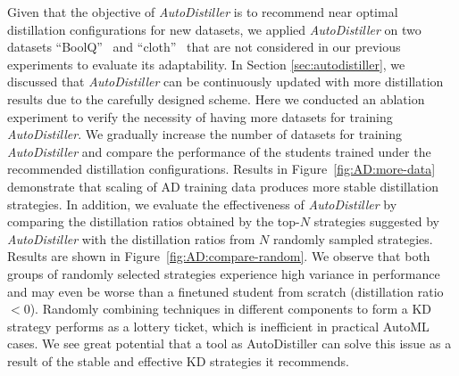 \documentclass[11pt]{article}
\begin{document}
Given that the objective of \emph{AutoDistiller} is to recommend near optimal distillation configurations for new datasets, we applied \emph{AutoDistiller} on two datasets ``BoolQ''~\citep{wang2019superglue} and ``cloth''~\citep{shi2021multimodal} that are not considered in our previous experiments to evaluate its adaptability. In Section \ref{sec:autodistiller}, we discussed that \emph{AutoDistiller} can be continuously updated with more distillation results due to the carefully designed scheme. Here we conducted an ablation experiment to verify the necessity of having more datasets for training \emph{AutoDistiller}. We gradually increase the number of datasets for training \emph{AutoDistiller} and compare the performance of the students trained under the recommended distillation configurations. Results in Figure~\ref{fig:AD:more-data} demonstrate that scaling of AD training data produces more stable distillation strategies.
In addition, we evaluate the effectiveness of \emph{AutoDistiller} by comparing the distillation ratios obtained by the top-$N$ strategies suggested by \emph{AutoDistiller} with the distillation ratios from $N$ randomly sampled strategies. Results are shown in Figure~\ref{fig:AD:compare-random}. We observe that both groups of randomly selected strategies experience high variance in performance and may even be worse than a finetuned student from scratch (distillation ratio $<0$). Randomly combining techniques in different components to form a KD strategy performs as a lottery ticket, which is inefficient in practical AutoML cases. We see great potential that a tool as AutoDistiller can solve this issue as a result of the stable and effective KD strategies it recommends. 
\end{document}
